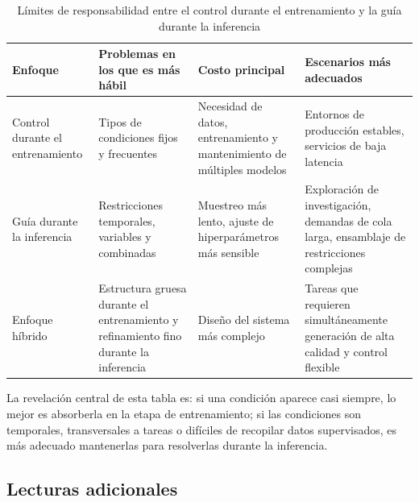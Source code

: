 \documentclass[a4paper]{article}
\begin{document}
\begin{table}[H]
\centering
\begin{tabular}{p{} p{} p{} p{}}
\toprule
Enfoque & Problemas en los que es más hábil & Costo principal & Escenarios más adecuados \\
\midrule
Control durante el entrenamiento & Tipos de condiciones fijos y frecuentes & Necesidad de datos, entrenamiento y mantenimiento de múltiples modelos & Entornos de producción estables, servicios de baja latencia \\
Guía durante la inferencia & Restricciones temporales, variables y combinadas & Muestreo más lento, ajuste de hiperparámetros más sensible & Exploración de investigación, demandas de cola larga, ensamblaje de restricciones complejas \\
Enfoque híbrido & Estructura gruesa durante el entrenamiento y refinamiento fino durante la inferencia & Diseño del sistema más complejo & Tareas que requieren simultáneamente generación de alta calidad y control flexible \\
\bottomrule
\end{tabular}
\caption{Límites de responsabilidad entre el control durante el entrenamiento y la guía durante la inferencia}
\end{table}

La revelación central de esta tabla es: si una condición aparece casi siempre, lo mejor es absorberla en la etapa de entrenamiento; si las condiciones son temporales, transversales a tareas o difíciles de recopilar datos supervisados, es más adecuado mantenerlas para resolverlas durante la inferencia.

\subsection{Lecturas adicionales}
\end{document}
